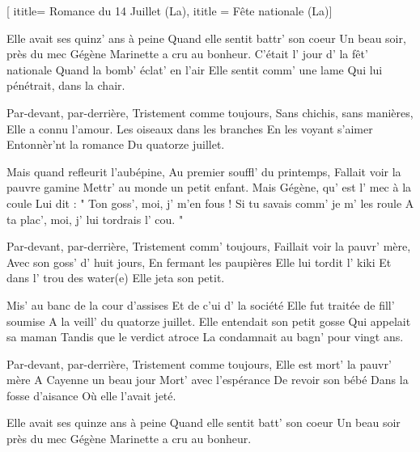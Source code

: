  [
ititle= {Romance du 14 Juillet (La)},
ititle = {Fête nationale (La)}]


\beginverse
Elle avait ses quinz' ans à peine
Quand elle sentit battr' son coeur
Un beau soir, près du mec Gégène
Marinette a cru au bonheur.
C'était l' jour d' la fêt' nationale
Quand la bomb' éclat' en l'air
Elle sentit comm' une lame
Qui lui pénétrait, dans la chair.
\endverse

\beginchorus
Par-devant, par-derrière,
Tristement comme toujours,
Sans chichis, sans manières,
Elle a connu l'amour.
Les oiseaux dans les branches
En les voyant s'aimer
Entonnèr'nt la romance
Du quatorze juillet.
\endchorus

\beginverse
Mais quand refleurit l'aubépine,
Au premier souffl' du printemps,
Fallait voir la pauvre gamine
Mettr' au monde un petit enfant.
Mais Gégène, qu' est l' mec à la coule
Lui dit : " Ton goss', moi, j' m'en fous !
Si tu savais comm' je m' les roule
A ta plac', moi, j' lui tordrais l' cou. "
\endverse

\beginchorus
Par-devant, par-derrière,
Tristement comm' toujours,
Faillait voir la pauvr' mère,
Avec son goss' d' huit jours,
En fermant les paupières
Elle lui tordit l' kiki
Et dans l' trou des water(e)
Elle jeta son petit.
\endchorus

\beginverse
Mis' au banc de la cour d'assises
Et de c'ui d' la société
Elle fut traitée de fill' soumise
A la veill' du quatorze juillet.
Elle entendait son petit gosse
Qui appelait sa maman
Tandis que le verdict atroce
La condamnait au bagn' pour vingt ans.
\endverse

\beginchorus
Par-devant, par-derrière,
Tristement comme toujours,
Elle est mort' la pauvr' mère
A Cayenne un beau jour
Mort' avec l'espérance
De revoir son bébé
Dans la fosse d'aisance
Où elle l'avait jeté.
\endchorus

\beginverse
Elle avait ses quinze ans à peine
Quand elle sentit batt' son coeur
Un beau soir près du mec Gégène
Marinette a cru au bonheur.
\endverse

\endsong